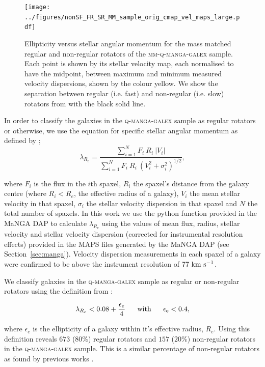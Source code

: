 \documentclass[useAMS,usenatbib]{mn2e}
\begin{document}
\begin{figure}
\centering
\texttt{[image: ../figures/nonSF\_FR\_SR\_MM\_sample\_orig\_cmap\_vel\_maps\_large.pdf]}
\caption{Ellipticity versus stellar angular momentum for the mass matched regular and non-regular rotators of the \textsc{mm-q-manga-galex} sample. Each point is shown by its stellar velocity map, each normalised to have the midpoint, between maximum and minimum measured velocity dispersions, shown by the colour yellow. We show the separation between regular (i.e. fast) and non-regular (i.e. slow) rotators from \protect\cite{cappellari16} with the black solid line.}
\label{fig:evsl}
\end{figure}


In order to classify the galaxies in the \textsc{q-manga-galex} sample as regular rotators or otherwise, we use the equation for specific stellar angular momentum as defined by \cite{emsellem07, emsellem11};
\begin{equation}
\lambda_{R_{e}} = \frac{\sum_{i=1}^{N} F_i\ R_i\ |V_i|}{\sum_{i=1}^{N} F_i\ R_i\ (V_i^2 + \sigma_i^2)^{1/2}},
\end{equation}	

where $F_i$ is the flux in the $i$th spaxel, $R_i$ the spaxel's distance from the galaxy centre (where $R_i < R_e$, the effective radius of a galaxy), $V_i$ the mean stellar velocity in that spaxel, $\sigma_i$ the stellar velocity dispersion in that spaxel and $N$ the total number of spaxels. In this work we use the python function provided in the MaNGA DAP to calculate $\lambda_{R_{e}}$ using the values of mean flux, radius, stellar velocity and stellar velocity dispersion (corrected for instrumental resolution effects) provided in the MAPS files generated by the MaNGA DAP (see Section~\ref{sec:manga}). Velocity dispersion measurements in each spaxel of a galaxy were confirmed to be above the instrument resolution of $77~\rm{km}~\rm{s}^{-1}$.

We classify galaxies in the \textsc{q-manga-galex} sample as regular or non-regular rotators using the definition from \cite{cappellari16}:

\begin{equation}
\lambda_{R_{e}} < 0.08 + \frac{\epsilon_e}{4} ~~~~~ \rm{with} ~~~~~ \epsilon_e < 0.4,
\end{equation}

where $\epsilon_e$ is the ellipticity of a galaxy within it's effective radius, $R_e$. Using this definition reveals $673$ ($80\%$) regular rotators and $157$ ($20\%$) non-regular rotators in the \textsc{q-manga-galex} sample. This is a similar percentage of non-regular rotators as found by previous works \citep[$14-17\%$ of early-types; ][]{emsellem11, stott16}.
\end{document}
